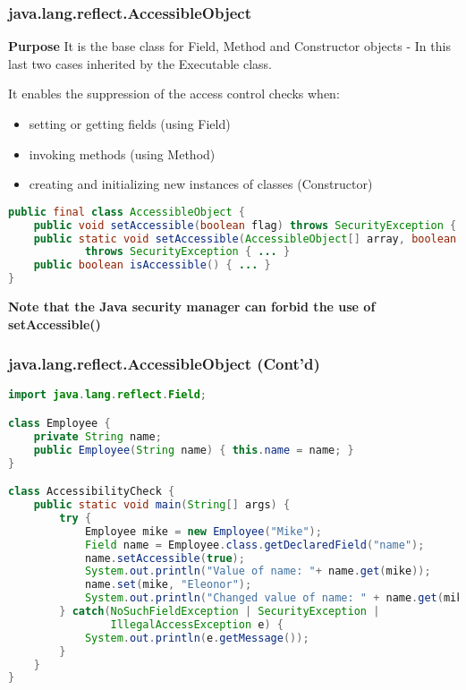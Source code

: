 \subsubsection{java.lang.reflect.AccessibleObject}

\textbf{Purpose}
It is the base class for Field, Method and Constructor objects
	- In this last two cases inherited by the Executable class.

It enables the suppression of the access control checks when:
\begin{itemize}
	\item setting or getting fields (using Field)
	\item invoking methods (using Method)
	\item  creating and initializing new instances of classes (Constructor)
\end{itemize}

\begin{lstlisting}[language=Java]
public final class AccessibleObject {
	public void setAccessible(boolean flag) throws SecurityException { ... }
	public static void setAccessible(AccessibleObject[] array, boolean flag)
			throws SecurityException { ... }
	public boolean isAccessible() { ... }
}
\end{lstlisting}

\textbf{Note that the Java security manager can forbid the use of setAccessible()}

\subsubsection{java.lang.reflect.AccessibleObject (Cont'd)}

\begin{lstlisting}[language=Java]
import java.lang.reflect.Field;

class Employee {
	private String name;
	public Employee(String name) { this.name = name; }
}

class AccessibilityCheck {
	public static void main(String[] args) {
		try {
			Employee mike = new Employee("Mike");
			Field name = Employee.class.getDeclaredField("name");
			name.setAccessible(true);
			System.out.println("Value of name: "+ name.get(mike));
			name.set(mike, "Eleonor");
			System.out.println("Changed value of name: " + name.get(mike));
		} catch(NoSuchFieldException | SecurityException |
				IllegalAccessException e) {
			System.out.println(e.getMessage());
		}
	}
}
\end{lstlisting}

